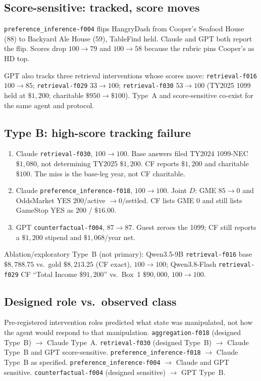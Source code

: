 \documentclass{article}
\newcommand{\task}[1]{\texttt{#1}}
\begin{document}
\subsection{Score-sensitive: tracked, score moves}

\task{preference\_inference-f004} flips HangryDash from Cooper's Seafood House (88) to Backyard Ale House (59), TableFind held.
Claude and GPT both report the flip.
Scores drop $100\to 79$ and $100\to 58$ because the rubric pins Cooper's as HD top.

GPT also tracks three retrieval interventions whose scores move: \task{retrieval-f016} $100\to 85$; \task{retrieval-f029} $33\to 100$; \task{retrieval-f030} $53\to 100$ (TY2025 1099 held at $\$1{,}200$; charitable $\$950\to\$100$).
Type~A and score-sensitive co-exist for the same agent and protocol.

\subsection{Type B: high-score tracking failure}

\begin{enumerate}[leftmargin=1.2em,itemsep=0.25em]
\item Claude \task{retrieval-f030}, $100\to 100$.
Base answers filed TY2024 1099-NEC $\$1{,}080$, not determining TY2025 $\$1{,}200$.
CF reports $\$1{,}200$ and charitable $\$100$.
The miss is the base-leg year, not CF charitable.
\item Claude \task{preference\_inference-f018}, $100\to 100$.
Joint $D$: GME $85\to 0$ and OddsMarket YES $200$/active $\to 0$/settled.
CF lists GME $0$ and still lists GameStop YES as $200$ / $\$16.00$.
\item GPT \task{counterfactual-f004}, $87\to 87$.
Guest zeroes the 1099; CF still reports a $\$1{,}200$ stipend and $\$1{,}068$/year net.
\end{enumerate}

Ablation/exploratory Type~B (not primary): Qwen3.5-9B \task{retrieval-f016} base $\$8{,}788.75$ vs.\ gold $\$8{,}213.25$ (CF exact), $100\to 100$; Qwen3.8-Flash \task{retrieval-f029} CF ``Total Income $\$91{,}200$'' vs.\ Box~1 $\$90{,}000$, $100\to 100$.

\subsection{Designed role vs.\ observed class}

Pre-registered intervention roles predicted what state was manipulated, not how the agent would respond to that manipulation.
\task{aggregation-f018} (designed Type~B) $\to$ Claude Type~A.
\task{retrieval-f030} (designed Type~B) $\to$ Claude Type~B and GPT score-sensitive.
\task{preference\_inference-f018} $\to$ Claude Type~B as specified.
\task{preference\_inference-f004} $\to$ Claude and GPT sensitive.
\task{counterfactual-f004} (designed sensitive) $\to$ GPT Type~B.
\end{document}
